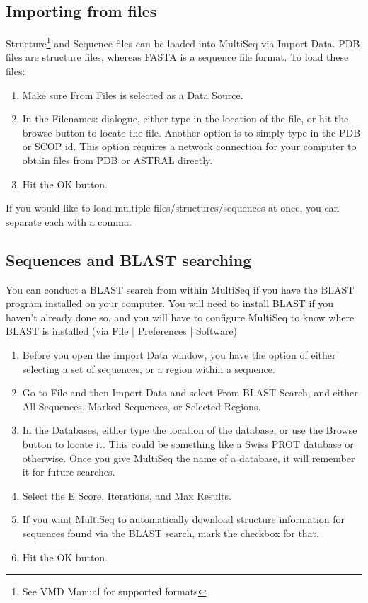 \subsection{Importing from files}
Structure\footnote{See VMD Manual for supported formats} and Sequence
files can be loaded into MultiSeq via \textsf{Import Data}.  PDB files are
structure files, whereas FASTA is a sequence file format.  To load these
files:
\begin{enumerate}
\item Make sure \textsf{From Files} is selected as a \textsf{Data
Source}.
\item In the \textsf{Filenames:} dialogue, either type in the location of the
file, or hit the browse button to locate the file.  Another option 
is to simply type in the PDB or SCOP id.  This option requires
a network connection for your computer to obtain files from PDB or
ASTRAL directly.
\item Hit the \textsf{OK} button.
\end{enumerate}
\noindent
If you would like to load multiple files/structures/sequences at once, 
you can separate each with a comma.\\

\subsection{Sequences and BLAST searching}
You can conduct a BLAST search from within MultiSeq if you have the
BLAST program installed on your computer.  You will need to install
BLAST if you haven't already done so, and you will have to configure
MultiSeq to know where BLAST is installed (via \textsf{File} |
\textsf{Preferences} | \textsf{Software})  

\begin{enumerate}
\item Before you open the \textsf{Import Data} window, you have the option of
either selecting a set of sequences, or a region within a sequence.
\item Go to \textsf{File} and then \textsf{Import Data} and select
\textsf{From BLAST Search}, 
and either \textsf{All Sequences}, \textsf{Marked Sequences}, or
\textsf{Selected Regions}.
\item In the \textsf{Databases}, either type the location of the
database, or use the \textsf{Browse} button to locate it.  This could be
something like a Swiss PROT database or otherwise.  Once you give
MultiSeq the name of a database, it will remember it for future
searches.  
\item Select the \textsf{E Score}, \textsf{Iterations}, and \textsf{Max
Results}.
\item If you want MultiSeq to automatically download structure
information for sequences found via the BLAST search, mark the checkbox
for that.
\item Hit the \textsf{OK} button.
\end{enumerate}

